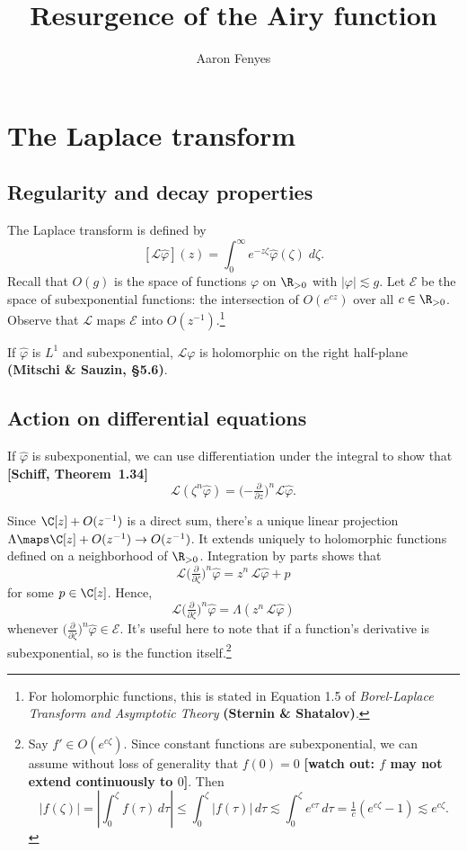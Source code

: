 \documentclass{article}
\title{Resurgence of the Airy function}
\author{Aaron Fenyes}
\theoremstyle{definition}
\theoremstyle{plain}
\newcommand{\laplace}{\mathcal{L}}
\begin{document}
\maketitle
\section{The Laplace transform}
\subsection{Regularity and decay properties}
The Laplace transform is defined by
\[ [\mathcal{L}\hat{\varphi}](z) = \int_0^\infty e^{-z \zeta} \hat{\varphi}(\zeta)\;d\zeta. \]
Recall that $O(g)$ is the space of functions $\varphi$ on $\R_{> 0}$ with $|\varphi| \lesssim g$. Let $\mathcal{E}$ be the space of subexponential functions: the intersection of $O(e^{cz})$ over all $c \in \R_{> 0}$. Observe that $\laplace$ maps $\mathcal{E}$ into $O(z^{-1})$.\footnote{For holomorphic functions, this is stated in Equation 1.5 of {\em Borel-Laplace Transform and Asymptotic Theory} \textbf{(Sternin \& Shatalov)}.}

If $\hat{\varphi}$ is $L^1$ and subexponential, $\laplace \varphi$ is holomorphic on the right half-plane \textbf{(Mitschi \& Sauzin, \S 5.6)}.
\subsection{Action on differential equations}
If $\hat{\varphi}$ is subexponential, we can use differentiation under the integral to show that \textbf{[Schiff, Theorem~1.34]}
\[ \laplace (\zeta^n \hat{\varphi}) = \big({-\tfrac{\partial}{\partial z}}\big)^n \laplace \hat{\varphi}. \]

Since $\C[z] + O(z^{-1})$ is a direct sum, there's a unique linear projection $\Lambda \maps \C[z] + O(z^{-1}) \to O(z^{-1})$. It extends uniquely to holomorphic functions defined on a neighborhood of $\R_{> 0}$. Integration by parts shows that
\[ \laplace \big(\tfrac{\partial}{\partial \zeta}\big)^n \hat{\varphi} = z^n\,\laplace \hat{\varphi} + p \]
for some $p \in \C[z]$. Hence,
\[ \laplace \big(\tfrac{\partial}{\partial \zeta}\big)^n \hat{\varphi} = \Lambda (z^n\,\laplace \hat{\varphi}) \]
whenever $\big(\tfrac{\partial}{\partial \zeta}\big)^n \hat{\varphi} \in \mathcal{E}$. It's useful here to note that if a function's derivative is subexponential, so is the function itself.\footnote{Say $f' \in O(e^{c\zeta})$. Since constant functions are subexponential, we can assume without loss of generality that $f(0) = 0$ \textbf{[watch out: $f$ may not extend continuously to $0$]}. Then \[ |f(\zeta)| = \left|\int_0^\zeta f(\tau)\,d\tau\right| \le \int_0^\zeta |f(\tau)|\,d\tau \lesssim \int_0^\zeta e^{c\tau}\,d\tau = \tfrac{1}{c}(e^{c\zeta} - 1) \lesssim e^{c\zeta}.\]}
\end{document}
